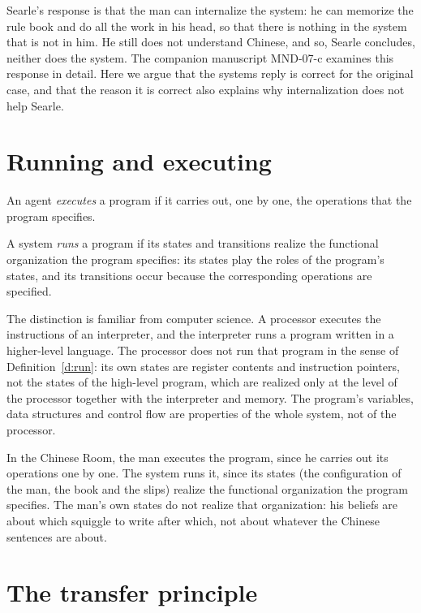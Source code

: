 \documentclass{situationist-preprint}
\begin{document}
Searle's response is that the man can internalize the system: he can memorize the rule book and do all the work in his head, so that there is nothing in the system that is not in him. He still does not understand Chinese, and so, Searle concludes, neither does the system. The companion manuscript MND-07-c examines this response in detail. Here we argue that the systems reply is correct for the original case, and that the reason it is correct also explains why internalization does not help Searle.

\section{Running and executing}

\begin{definition}\label{d:execute}
An agent \emph{executes} a program if it carries out, one by one, the operations that the program specifies.
\end{definition}

\begin{definition}\label{d:run}
A system \emph{runs} a program if its states and transitions realize the functional organization the program specifies: its states play the roles of the program's states, and its transitions occur because the corresponding operations are specified.
\end{definition}

The distinction is familiar from computer science. A processor executes the instructions of an interpreter, and the interpreter runs a program written in a higher-level language. The processor does not run that program in the sense of Definition~\ref{d:run}: its own states are register contents and instruction pointers, not the states of the high-level program, which are realized only at the level of the processor together with the interpreter and memory. The program's variables, data structures and control flow are properties of the whole system, not of the processor.

In the Chinese Room, the man executes the program, since he carries out its operations one by one. The system runs it, since its states (the configuration of the man, the book and the slips) realize the functional organization the program specifies. The man's own states do not realize that organization: his beliefs are about which squiggle to write after which, not about whatever the Chinese sentences are about.

\section{The transfer principle}
\end{document}
